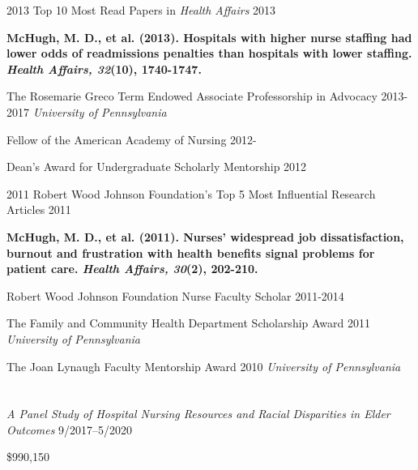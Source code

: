 \documentclass[10pt,]{article}
\begin{document}
{{{{{2013	Top 10 Most Read Papers in {\textit {Health Affairs}} \hfill 2013
\vspace{-2.5mm}
\begin{adjustwidth}{1cm}{1cm}
{\footnotesize {\textbf {McHugh, M. D., et al. (2013). Hospitals with higher nurse staffing had lower odds of readmissions penalties than hospitals with lower staffing. {\textit {Health Affairs, 32}}(10), 1740-1747.}}}
\end{adjustwidth}

The Rosemarie Greco Term Endowed Associate Professorship in Advocacy \hfill 2013-2017 \newline
\hspace*{0.5cm} {\textit {University of Pennsylvania}}

Fellow of the American Academy of Nursing \hfill {2012-{\small{}}}

Dean’s Award for Undergraduate Scholarly Mentorship \hfill 2012	

2011 Robert Wood Johnson Foundation’s Top 5 Most Influential Research Articles \hfill 2011 
\vspace{-2.5mm}
\begin{adjustwidth}{1cm}{1cm}
{\footnotesize {\textbf {McHugh, M. D., et al. (2011). Nurses’ widespread job dissatisfaction, burnout and frustration with health benefits signal problems for patient care. {\textit {Health Affairs, 30}}(2), 202-210.}}}
\end{adjustwidth}

Robert Wood Johnson Foundation Nurse Faculty Scholar \hfill 2011-2014	

The Family and Community Health Department Scholarship Award \hfill 2011 \newline
\hspace*{0.5cm} {\textit {University of Pennsylvania}}

The Joan Lynaugh Faculty Mentorship Award \hfill 2010 \newline
\hspace*{0.5cm} {\textit {University of Pennsylvania}}

\section{\Large {}} 


\textit {A Panel Study of Hospital Nursing Resources and Racial Disparities in Elder Outcomes} \hfill  9/2017--5/2020 \newline
{ \hfill \$990,150 

}}}}}}
\end{document}
